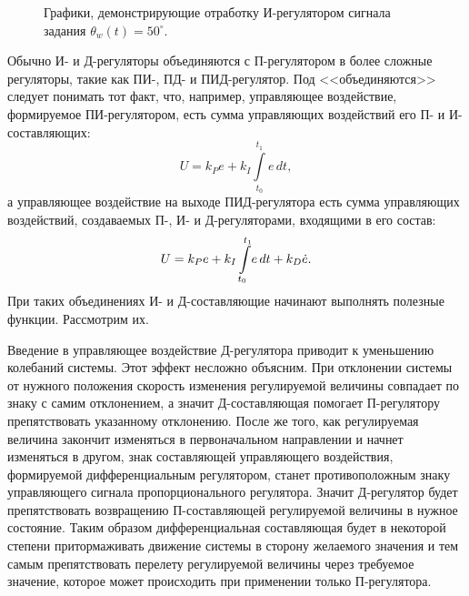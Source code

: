 \documentclass[12pt,a4paper,openany]{extarticle}
\begin{document}
\begin{figure}[h!]
	\vspace{-1cm}
	\caption{Графики, демонстрирующие отработку И-регулятором сигнала задания $\theta_w(t) = 50^\circ$.}
	\label{fig:I_regul_const_g}
\end{figure}

Обычно И- и Д-регуляторы объединяются с П-регулятором в более сложные регуляторы, такие как ПИ-, ПД- и ПИД-регулятор.
Под <<объединяются>> следует понимать тот факт, что, например, управляющее воздействие, формируемое ПИ-регулятором, есть сумма управляющих воздействий его П- и И-составляющих:
\begin{equation}
U = k_Pe + k_I\int\limits_{t_0}^{t_1} \!e\,dt,
\end{equation}
а управляющее воздействие на выходе ПИД-регулятора есть сумма управляющих воздействий, создаваемых П-, И- и Д-регуляторами, входящими в его состав:
\begin{equation}
U = k_Pe + k_I\int\limits_{t_0}^{t_1} \!e\,dt + k_D\dot{e}\ldotp
\end{equation}
При таких объединениях И- и Д-составляющие начинают выполнять полезные функции. Рассмотрим их.

Введение в управляющее воздействие Д-регулятора приводит к уменьшению колебаний системы.
Этот эффект несложно объясним.
При отклонении системы от нужного положения скорость изменения регулируемой величины совпадает по знаку с самим отклонением, а значит Д-составляющая помогает П-регулятору препятствовать указанному отклонению.
После же того, как регулируемая величина закончит изменяться в первоначальном направлении и начнет изменяться в другом, знак составляющей управляющего воздействия, формируемой дифференциальным регулятором, станет противоположным знаку управляющего сигнала пропорционального регулятора.
Значит Д-регулятор будет препятствовать возвращению П-составляющей регулируемой величины в нужное состояние.
Таким образом дифференциальная составляющая будет в некоторой степени притормаживать движение системы в сторону желаемого значения и тем самым препятствовать перелету регулируемой величины через требуемое значение, которое может происходить при применении только П-регулятора.
\end{document}
